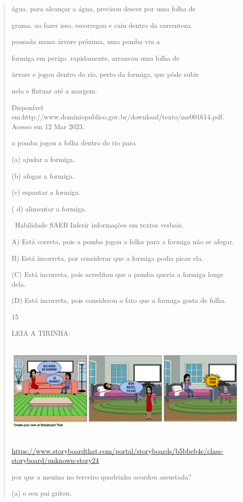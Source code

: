 {{{{\begin{verse}
{{\begin{escolha}
{{{{{água. para alcançar a água, precisou descer por uma folha de

grama. ao fazer isso, escorregou e caiu dentro da correnteza.

pousada numa árvore próxima, uma pomba viu a

formiga em perigo. rapidamente, arrancou uma folha de

árvore e jogou dentro do rio, perto da formiga, que pôde subir

nela e flutuar até a margem.

Disponível
em:http://www.dominiopublico.gov.br/download/texto/me001614.pdf. Acesso
em 12 Mar 2023.

a pomba jogou a folha dentro do rio para

(a) ajudar a formiga.

(b) afogar a formiga.

(c) espantar a formiga.

( d) alimentar a formiga.

~Habilidade SAEB Inferir informações em textos verbais.

A) Está correta, pois a pomba jogou a folha para a formiga não se
afogar.

B) Está incorreta, por considerar que a formiga podia picar ela.

(C) Está incorreta, pois acreditou que a pomba queria a formiga longe
dela.

(D) Está incorreta, pois considerou o fato que a formiga gosta de folha.

\num{15}

LEIA A TIRINHA:

\includegraphics[width=5.90556in,height=1.95694in]{media/image172.png}

\url{https://www.storyboardthat.com/portal/storyboards/b5bbeb4e/class-storyboard/unknown-story24}

por que a menina no terceiro quadrinho acordou assustada?

(a) o seu pai gritou.

}}}}}
\end{escolha}}}
\end{verse}}}}}

